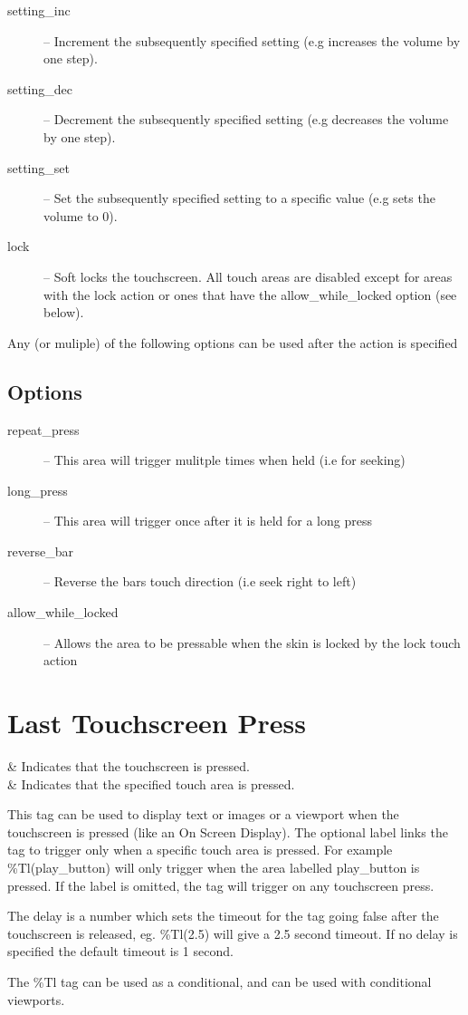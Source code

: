 {\begin{description}
    \item[setting\_inc] -- Increment the subsequently specified setting (e.g
       increases the volume by one step).
    \item[setting\_dec] -- Decrement the subsequently specified setting (e.g
       decreases the volume by one step).
    \item[setting\_set] -- Set the subsequently specified setting to a specific value (e.g
       sets the volume to 0).
    \item[lock] -- Soft locks the touchscreen.  All touch areas are disabled except for
        areas with the lock action or ones that have the allow\_while\_locked option (see below).
  \end{description}
  Any (or muliple) of the following options can be used after the action is specified
  \subsection{Options}
  \begin{description}
    \item[repeat\_press] -- This area will trigger mulitple times when held (i.e for seeking)
    \item[long\_press] -- This area will trigger once after it is held for a long press
    \item[reverse\_bar] -- Reverse the bars touch direction (i.e seek right to left)
    \item[allow\_while\_locked] -- Allows the area to be pressable when the
        skin is locked by the lock touch action
  \end{description}

  \section{Last Touchscreen Press}
    \begin{tagmap}
       & Indicates that the touchscreen is pressed.\\
       & Indicates that the specified touch area is pressed.\\
    \end{tagmap}
  This tag can be used to display text or images or a viewport when the
  touchscreen is pressed (like an On Screen Display). The optional label
  links the tag to trigger only when a specific touch area is pressed.
  For example \%Tl(play\_button) will only trigger when the area labelled
  play\_button is pressed. If the label is omitted, the tag will trigger
  on any touchscreen press.

  The delay is a number which sets the timeout for the tag going false
  after the touchscreen is released, eg. \%Tl(2.5) will give a 2.5 second
  timeout. If no delay is specified the default timeout is 1 second.

  The \%Tl tag can be used as a conditional, and can be used with
  conditional viewports.
}


